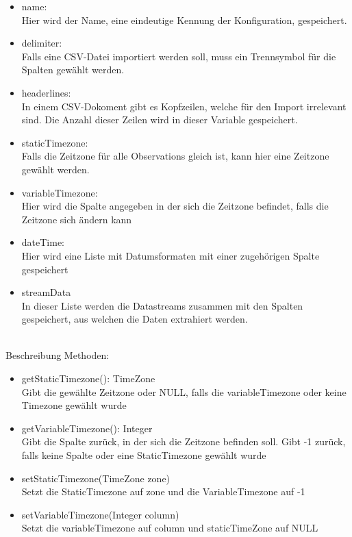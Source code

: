\begin{itemize}
	\item name:\\Hier wird der Name, eine eindeutige Kennung der Konfiguration, gespeichert.
	
	\item delimiter: \\Falls eine CSV-Datei importiert werden soll, muss ein Trennsymbol für die Spalten gewählt werden.
	
	\item headerlines: \\In einem CSV-Dokoment gibt es Kopfzeilen, welche für den Import irrelevant sind. Die Anzahl dieser Zeilen wird in dieser Variable gespeichert.
	
	\item staticTimezone: \\Falls die Zeitzone für alle Observations gleich ist, kann hier eine Zeitzone gewählt werden.
	
	\item variableTimezone: \\Hier wird die Spalte angegeben in der sich die Zeitzone befindet, falls die Zeitzone sich ändern kann
	
	\item dateTime:\\Hier wird eine Liste mit Datumsformaten mit einer zugehörigen Spalte gespeichert
	
	\item streamData\\ In dieser Liste werden die Datastreams zusammen mit den Spalten gespeichert, aus welchen die Daten extrahiert werden.
	
\end{itemize}
\ \\
Beschreibung Methoden:
\begin{itemize}
	\item getStaticTimezone(): TimeZone\\
	Gibt die gewählte Zeitzone oder NULL, falls die variableTimezone oder keine Timezone gewählt wurde
	
	\item getVariableTimezone(): Integer\\
	Gibt die Spalte zurück, in der sich die Zeitzone befinden soll.
	Gibt -1 zurück, falls keine Spalte oder eine StaticTimezone gewählt wurde
	
	\item setStaticTimezone(TimeZone zone) \\
	Setzt die StaticTimezone auf zone und die VariableTimezone auf -1
	
	\item setVariableTimezone(Integer column) \\
	Setzt die variableTimezone auf column und staticTimeZone auf NULL
\end{itemize}

